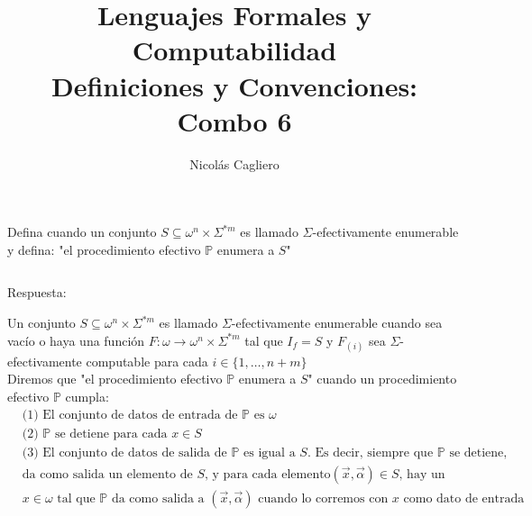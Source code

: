 \documentclass{article}
\title{Lenguajes Formales y Computabilidad \\
        \large Definiciones y Convenciones: Combo 6 }
\author{Nicolás Cagliero}
\begin{document}
\maketitle

Defina cuando un conjunto $S \subseteq \omega^n \times \Sigma^{*m}$
es llamado $\Sigma$-efectivamente enumerable y defina: "el procedimiento
efectivo $\mathbb{P}$ enumera a $S$"

\(\)
\begin{center}
    Respuesta: 
    \(\)
\end{center}

Un conjunto $S \subseteq \omega^n \times \Sigma^{*m}$
es llamado $\Sigma$-efectivamente enumerable cuando sea vacío
o haya una función $F : \omega \rightarrow \omega^n \times \Sigma^{*m}$ 
tal que $I_f = S$ y $F_{(i)}$ sea $\Sigma$-efectivamente computable
para cada $i \in \{1, \dots, n + m\}$\\

Diremos que "el procedimiento efectivo $\mathbb{P}$ enumera a $S$"
cuando un procedimiento efectivo $\mathbb{P}$ cumpla:
\begin{align*}
        &\text{(1) El conjunto de datos de entrada de } \mathbb{P}
        \text{ es } \omega\\
        &\text{(2) } \mathbb{P} \text{ se detiene para cada } x \in S\\
        &\text{(3) El conjunto de datos de salida de } \mathbb{P}
        \text{ es igual a } S. \text{ Es decir, siempre que } \mathbb{P}
        \text{ se detiene, }\\
        &\text{da como salida un elemento de } S
        \text{, y para cada elemento} 
        (\overset{\rightarrow}{x}, \overset{\rightarrow}{\alpha})
        \in S \text{, hay un }\\
        &x \in \omega \text{ tal que } \mathbb{P}
        \text{ da como salida a } 
        (\overset{\rightarrow}{x}, \overset{\rightarrow}{\alpha}) 
        \text{ cuando lo corremos con } x \text{ como dato de entrada }
\end{align*}
\end{document}
